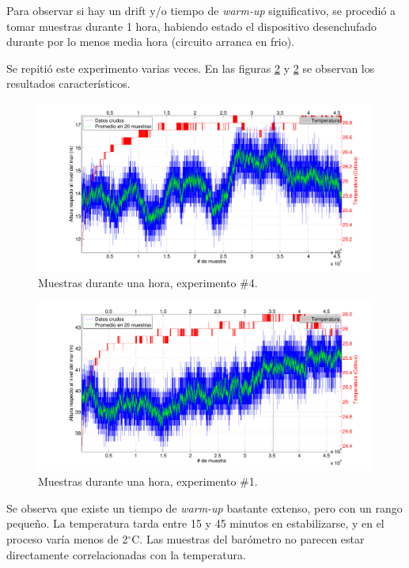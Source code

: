 \documentclass[spanish,12pt,a4paper,titlepage]{report}
\newcommand{\degc}{$^\circ$C}
\begin{document}
Para observar si hay un drift y/o tiempo de \textit{warm-up} significativo, se procedió a tomar muestras durante 1 hora, habiendo estado el dispositivo desenchufado durante por lo menos media hora (circuito arranca en frio).

Se repitió este experimento varias veces. En las figuras \ref{fig:1hora_01.pdf} y \ref{fig:1hora_01.pdf} se observan los resultados característicos.

\begin{figure}[h!]
  \includegraphics[width=.9\textwidth]{./pics/1hora_04.pdf}
  \caption{Muestras durante una hora, experimento \#4.}
  \label{fig:1hora_04.pdf}
\end{figure}
\vspace{-20pt}
\begin{figure}[h!]
  \includegraphics[width=.9\textwidth]{./pics/1hora_01.pdf}
  \caption{Muestras durante una hora, experimento \#1.}
  \label{fig:1hora_01.pdf}
\end{figure}


Se observa que existe un tiempo de \textit{warm-up} bastante extenso, pero con un rango pequeño. La temperatura tarda entre 15 y 45 minutos en estabilizarse, y en el proceso varía menos de 2\degc. Las muestras del barómetro no parecen estar directamente correlacionadas con la temperatura.
\end{document}
